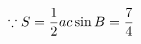 \documentclass[preview]{standalone}
\begin{document}
\begin{align*}
\special{dvisvgm:raw <g id='unique000'>}\because S=\frac{1}{2}ac\sin B=\frac{7}{4}\special{dvisvgm:raw </g>}
\end{align*}
\end{document}
